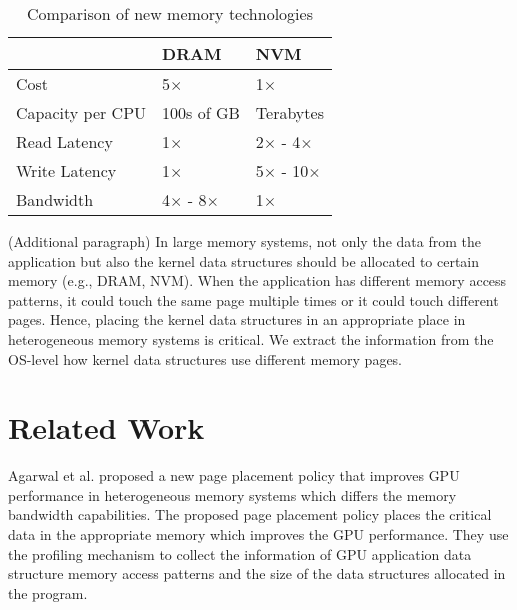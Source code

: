 \documentclass{sig-alternate}
\begin{document}
\begin{table}[t]
\centering
\begin{tabular}{|l|l|l|}
\hline
                 & DRAM       & NVM        \\ \hline
Cost             & 5$\times$        & 1$\times$        \\ \hline
Capacity per CPU & 100s of GB & Terabytes  \\ \hline
Read Latency     & 1$\times$        & 2$\times$ - 4$\times$  \\ \hline
Write Latency    & 1$\times$        & 5$\times$ - 10$\times$ \\ \hline
Bandwidth        & 4$\times$ - 8$\times$  & 1$\times$        \\ \hline
\end{tabular}
\caption{Comparison of new memory technologies \cite{venkataraman2011consistent, dulloor2016data, kannan2017heteroos}}
\end{table}

(Additional paragraph) In large memory systems, not only the data from the application but also the kernel data structures should be allocated to certain memory (e.g., DRAM, NVM). When the application has different memory access patterns, it could touch the same page multiple times or it could touch different pages. Hence, placing the kernel data structures in an appropriate place in heterogeneous memory systems is critical. We extract the information from the OS-level how kernel data structures use different memory pages. 


\section{Related Work}
Agarwal et al. \cite{Agarwal:2015:PPS:2694344.2694381} proposed a new page placement policy that improves GPU performance in heterogeneous memory systems which differs the memory bandwidth capabilities. The proposed page placement policy places the critical data in the appropriate memory which improves the GPU performance. They use the profiling mechanism to collect the information of GPU application data structure memory access patterns and the size of the data structures allocated in the program. 





\end{document}
